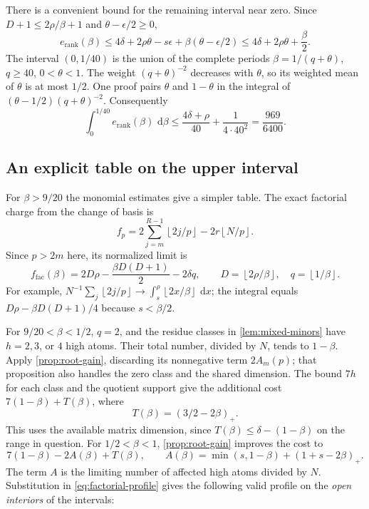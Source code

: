 \documentclass[11pt,letterpaper]{article}
\theoremstyle{definition}
\newcommand{\dd}{\,\mathrm d}
\newcommand{\floor}[1]{\left\lfloor #1\right\rfloor}
\begin{document}
There is a convenient bound for the remaining interval near zero. Since
$D+1\le2\rho/\beta+1$ and $\theta-\epsilon/2\ge0$,
\[
 e_{\mathrm{rank}}(\beta)
 \le4\delta+2\rho\theta-s\epsilon
                   +\beta(\theta-\epsilon/2)
 \le4\delta+2\rho\theta+\frac{\beta}{2}.
\]
The interval $(0,1/40)$ is the union of the complete periods
$\beta=1/(q+\theta)$, $q\ge40$, $0<\theta<1$.
The weight $(q+\theta)^{-2}$ decreases with $\theta$, so its weighted
mean of $\theta$ is at most $1/2$. One proof pairs $\theta$ and $1-\theta$
in the integral of $(\theta-1/2)(q+\theta)^{-2}$.
Consequently
\begin{equation}\label{eq:small-profile-tail}
 \int_0^{1/40}e_{\mathrm{rank}}(\beta)\,\dd\beta
 \le\frac{4\delta+\rho}{40}
           +\frac{1}{4\cdot40^2}
 =\frac{969}{6400}.
\end{equation}

\subsection{An explicit table on the upper interval}
For $\beta>9/20$ the monomial estimates give a simpler table. The exact
factorial charge from the change of basis is
\[
 f_p=2\sum_{j=m}^{R-1}\floor{2j/p}
                  -2r\floor{N/p}.
\]
Since $p>2m$ here, its normalized limit is
\begin{equation}\label{eq:factorial-profile}
 f_{\mathrm{fac}}(\beta)
 =2D\rho-\frac{\beta D(D+1)}2-2\delta q,
 \qquad D=\floor{2\rho/\beta},\quad q=\floor{1/\beta}.
\end{equation}
For example,
$N^{-1}\sum_j\floor{2j/p}\to\int_s^\rho\floor{2x/\beta}\,\dd x$;
the integral equals
$D\rho-\beta D(D+1)/4$ because $s<\beta/2$.

For $9/20<\beta<1/2$, $q=2$, and the residue classes in
\cref{lem:mixed-minors} have $h=2,3$, or $4$ high atoms.
Their total number, divided by $N$, tends to $1-\beta$.
Apply \cref{prop:root-gain}, discarding its nonnegative term $2A_m(p)$;
that proposition also handles the zero class and the shared dimension.
The bound $7h$ for each class and the quotient support give the additional
cost
$7(1-\beta)+T(\beta)$, where
\[
 T(\beta)=(3/2-2\beta)_+.
\]
This uses the available matrix dimension, since
$T(\beta)\le\delta-(1-\beta)$ on the range in question.
For $1/2<\beta<1$, \cref{prop:root-gain} improves the cost to
\[
 7(1-\beta)-2A(\beta)+T(\beta),\qquad
 A(\beta)=\min(s,1-\beta)+(1+s-2\beta)_+ .
\]
The term $A$ is the limiting number of affected high atoms divided by $N$.
Substitution in \eqref{eq:factorial-profile} gives the following valid
profile on the \emph{open interiors} of the intervals:
\end{document}
